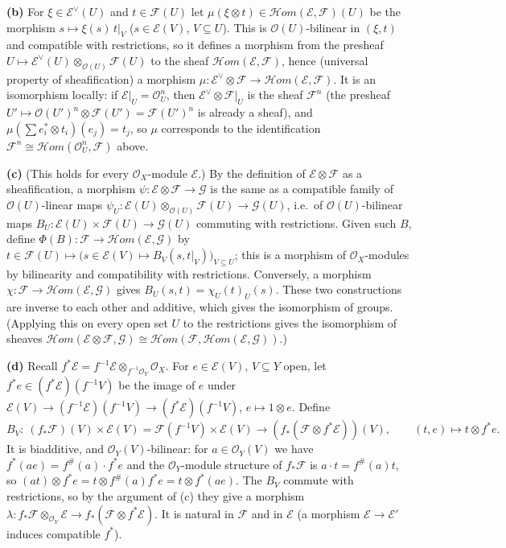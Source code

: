 \documentclass[11pt]{article}
\begin{document}
\textbf{(b)} For $\xi\in\mathcal E^\vee(U)$ and $t\in\mathcal F(U)$ let $\mu(\xi\otimes t)\in\mathcal{H}om(\mathcal E,\mathcal F)(U)$ be the morphism $s\mapsto\xi(s)\,t|_V$ ($s\in\mathcal E(V)$, $V\subseteq U$). This is $\mathcal O(U)$-bilinear in $(\xi,t)$ and compatible with restrictions, so it defines a morphism from the presheaf $U\mapsto\mathcal E^\vee(U)\otimes_{\mathcal O(U)}\mathcal F(U)$ to the sheaf $\mathcal{H}om(\mathcal E,\mathcal F)$, hence (universal property of sheafification) a morphism $\mu:\mathcal E^\vee\otimes\mathcal F\to\mathcal{H}om(\mathcal E,\mathcal F)$. It is an isomorphism locally: if $\mathcal E|_U=\mathcal O_U^n$, then $\mathcal E^\vee\otimes\mathcal F|_U$ is the sheaf $\mathcal F^n$ (the presheaf $U'\mapsto \mathcal O(U')^n\otimes\mathcal F(U')=\mathcal F(U')^n$ is already a sheaf), and $\mu(\sum e_i^*\otimes t_i)(e_j)=t_j$, so $\mu$ corresponds to the identification $\mathcal F^n\cong\mathcal{H}om(\mathcal O_U^n,\mathcal F)$ above.

\textbf{(c)} (This holds for every $\mathcal O_X$-module $\mathcal E$.) By the definition of $\mathcal E\otimes\mathcal F$ as a sheafification, a morphism $\psi:\mathcal E\otimes\mathcal F\to\mathcal G$ is the same as a compatible family of $\mathcal O(U)$-linear maps $\psi_U:\mathcal E(U)\otimes_{\mathcal O(U)}\mathcal F(U)\to\mathcal G(U)$, i.e.\ of $\mathcal O(U)$-bilinear maps $B_U:\mathcal E(U)\times\mathcal F(U)\to\mathcal G(U)$ commuting with restrictions. Given such $B$, define $\Phi(B):\mathcal F\to\mathcal{H}om(\mathcal E,\mathcal G)$ by $t\in\mathcal F(U)\mapsto\big(s\in\mathcal E(V)\mapsto B_V(s,t|_V)\big)_{V\subseteq U}$; this is a morphism of $\mathcal O_X$-modules by bilinearity and compatibility with restrictions. Conversely, a morphism $\chi:\mathcal F\to\mathcal{H}om(\mathcal E,\mathcal G)$ gives $B_U(s,t)=\chi_U(t)_U(s)$. These two constructions are inverse to each other and additive, which gives the isomorphism of groups. (Applying this on every open set $U$ to the restrictions gives the isomorphism of sheaves $\mathcal{H}om(\mathcal E\otimes\mathcal F,\mathcal G)\cong\mathcal{H}om(\mathcal F,\mathcal{H}om(\mathcal E,\mathcal G))$.)

\textbf{(d)} Recall $f^*\mathcal E=f^{-1}\mathcal E\otimes_{f^{-1}\mathcal O_Y}\mathcal O_X$. For $e\in\mathcal E(V)$, $V\subseteq Y$ open, let $f^*e\in(f^*\mathcal E)(f^{-1}V)$ be the image of $e$ under $\mathcal E(V)\to(f^{-1}\mathcal E)(f^{-1}V)\to(f^*\mathcal E)(f^{-1}V)$, $e\mapsto 1\otimes e$. Define
\[
B_V:\ (f_*\mathcal F)(V)\times\mathcal E(V)=\mathcal F(f^{-1}V)\times\mathcal E(V)\to(f_*(\mathcal F\otimes f^*\mathcal E))(V),\qquad (t,e)\mapsto t\otimes f^*e .
\]
It is biadditive, and $\mathcal O_Y(V)$-bilinear: for $a\in\mathcal O_Y(V)$ we have $f^*(ae)=f^\#(a)\cdot f^*e$ and the $\mathcal O_Y$-module structure of $f_*\mathcal F$ is $a\cdot t=f^\#(a)t$, so $(at)\otimes f^*e=t\otimes f^\#(a)f^*e=t\otimes f^*(ae)$. The $B_V$ commute with restrictions, so by the argument of (c) they give a morphism $\lambda:f_*\mathcal F\otimes_{\mathcal O_Y}\mathcal E\to f_*(\mathcal F\otimes f^*\mathcal E)$. It is natural in $\mathcal F$ and in $\mathcal E$ (a morphism $\mathcal E\to\mathcal E'$ induces compatible $f^*$).
\end{document}
